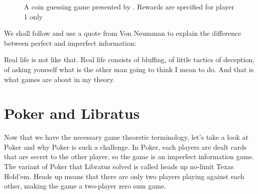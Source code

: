 \documentclass[10pt,a4paper]{article}
\begin{document}
\begin{figure}[ht]
  \centering
  \caption{A coin guessing game presented by \cite{brown2017safe}. Rewards are specified for player 1 only}
  \label{figure:SafeEg}
\end{figure}


We shall follow \cite{bowling2015heads} and use a quote from Von Neumman to explain the difference between perfect and imperfect information:

\begin{displayquote}
  Real life is not like that. Real life consists of bluffing, of little tactics of deception, of asking yourself what is the other man going to think I mean to do. And that is what games are about in my theory.
\end{displayquote}

\newpage
\section{Poker and Libratus}
Now that we have the necessary game theoretic terminology, let's take a look at Poker and why Poker is such a challenge. In Poker, each players are dealt cards that are secret to the other player, so the game is an imperfect information game. The variant of Poker that Libratus solved is called heads up no-limit Texas Hold'em. Heads up means that there are only two players playing against each other, making the game a two-player zero sum game.
\end{document}
